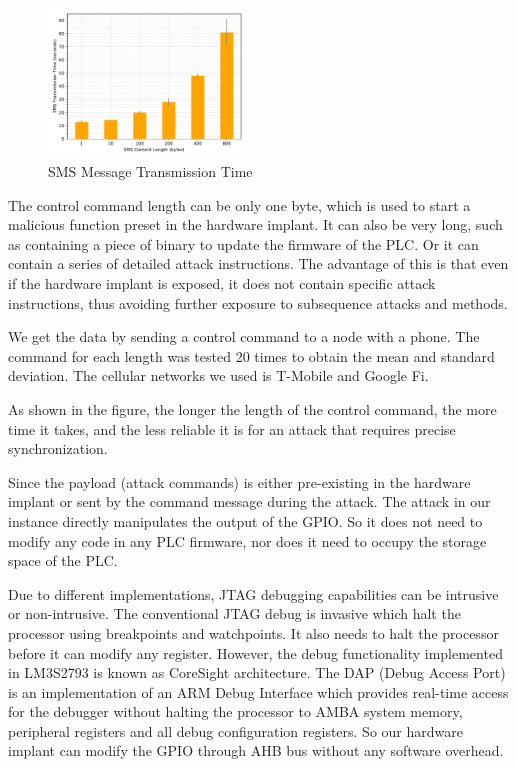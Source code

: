 \begin{figure}[th]
	\includegraphics[width=0.47\textwidth]{figures/smstime}
	\centering
	\caption{SMS Message Transmission Time}
	\label{fig:smstime}
\end{figure}

The control command length can be only one byte, which is used to start a malicious function preset in the hardware implant. It can also be very long, such as containing a piece of binary to update the firmware of the PLC. Or it can contain a series of detailed attack instructions. The advantage of this is that even if the hardware implant is exposed, it does not contain specific attack instructions, thus avoiding further exposure to subsequence attacks and methods.

We get the data by sending a control command to a node with a phone. The command for each length was tested 20 times to obtain the mean and standard deviation. The cellular networks we used is T-Mobile and Google Fi. 

As shown in the figure, the longer the length of the control command, the more time it takes, and the less reliable it is for an attack that requires precise synchronization.

Since the payload (attack commands) is either pre-existing in the hardware implant or sent by the command message during the attack. The attack in our instance directly manipulates the output of the GPIO. So it does not need to modify any code in any PLC firmware, nor does it need to occupy the storage space of the PLC.

Due to different implementations, JTAG debugging capabilities can be intrusive or non-intrusive. The conventional JTAG debug is invasive which halt the processor using breakpoints and watchpoints. It also needs to halt the processor before it can modify any register. However, the debug functionality implemented in LM3S2793 is known as CoreSight architecture. The DAP (Debug Access Port) is an implementation of an ARM Debug Interface which provides real-time access for the debugger without halting the processor to AMBA system memory, peripheral registers and all debug configuration registers. So our hardware implant can modify the GPIO through AHB bus without any software overhead.

